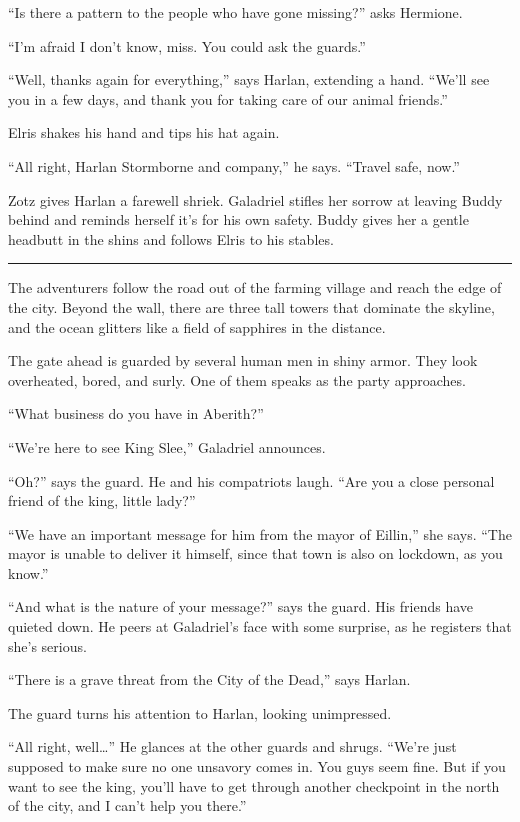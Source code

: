 \documentclass[smalldemyvopaper,11pt,twoside,onecolumn,openright,extrafontsizes]{memoir}
\begin{document}
``Is there a pattern to the people who have gone missing?'' asks
Hermione.

``I'm afraid I don't know, miss. You could ask the guards.''

``Well, thanks again for everything,'' says Harlan, extending a hand.
``We'll see you in a few days, and thank you for taking care of our
animal friends.''

Elris shakes his hand and tips his hat again.

``All right, Harlan Stormborne and company,'' he says. ``Travel safe,
now.''

Zotz gives Harlan a farewell shriek. Galadriel stifles her sorrow at
leaving Buddy behind and reminds herself it's for his own safety. Buddy
gives her a gentle headbutt in the shins and follows Elris to his
stables.

\begin{center}\rule{0.5\linewidth}{\linethickness}\end{center}

The adventurers follow the road out of the farming village and reach the
edge of the city. Beyond the wall, there are three tall towers that
dominate the skyline, and the ocean glitters like a field of sapphires
in the distance.

The gate ahead is guarded by several human men in shiny armor. They look
overheated, bored, and surly. One of them speaks as the party
approaches.

``What business do you have in Aberith?''

``We're here to see King Slee,'' Galadriel announces.

``Oh?'' says the guard. He and his compatriots laugh. ``Are you a close
personal friend of the king, little lady?''

``We have an important message for him from the mayor of Eillin,'' she
says. ``The mayor is unable to deliver it himself, since that town is
also on lockdown, as you know.''

``And what is the nature of your message?'' says the guard. His friends
have quieted down. He peers at Galadriel's face with some surprise, as
he registers that she's serious.

``There is a grave threat from the City of the Dead,'' says Harlan.

The guard turns his attention to Harlan, looking unimpressed.

``All right, well\ldots{}'' He glances at the other guards and shrugs.
``We're just supposed to make sure no one unsavory comes in. You guys
seem fine. But if you want to see the king, you'll have to get through
another checkpoint in the north of the city, and I can't help you
there.''
\end{document}
